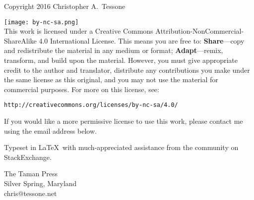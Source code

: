 \begingroup 
\footnotesize 
\parindent 0pt 
\parskip \baselineskip 
Copyright \textcopyright{} 2016 Christopher A.~Tessone

\texttt{[image: by-nc-sa.png]}\\
This work is licensed under a Creative Commons
Attribution-NonCommercial-ShareAlike 4.0 International License. This
means you are free to: \textbf{Share}---copy and redistribute the
material in any medium or format; \textbf{Adapt}---remix, transform,
and build upon the material. However, you must give appropriate credit
to the author and translator, distribute any contributions you make
under the same license as this original, and you may not use the
material for commercial purposes. For more on this license, see:

\texttt{http://creativecommons.org/licenses/by-nc-sa/4.0/}

If you would like a more permissive license to use this work, please
contact me using the email address below.

Typeset in \LaTeX\ with much-appreciated assistance from the
community on StackExchange. %


\vfill 

The Taman Press\\
Silver Spring, Maryland\\
chris@tessone.net

\endgroup 
\pagestyle{empty}
\clearpage 
